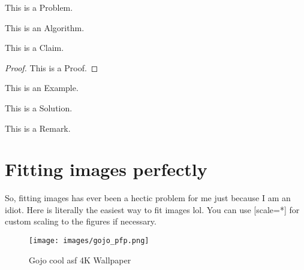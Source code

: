 \documentclass[12pt]{scrartcl}
\begin{document}
\begin{problem}
[Name]
This is a Problem.
\end{problem}

\begin{algorithm}
[Name]
This is an Algorithm.
\end{algorithm}

\begin{claim}
[Name]
This is a Claim.
\end{claim}

\begin{proof}
This is a Proof.
\end{proof}

\begin{example}
[Name]
This is an Example.
\end{example}

\begin{soln}
This is a Solution.
\end{soln}

\begin{remark}
[Name]
This is a Remark.
\end{remark}

\section{Fitting images perfectly}

So, fitting images has ever been a hectic problem for me just because I am an idiot. Here is literally the easiest way to fit images lol. You can use [scale=*] for custom scaling to the figures if necessary.

\begin{figure}[h]
    \centering
    \texttt{[image: images/gojo\_pfp.png]}
    \caption{Gojo cool asf 4K Wallpaper}
    \label{gojo4kwallpaper}
\end{figure}
\end{document}
